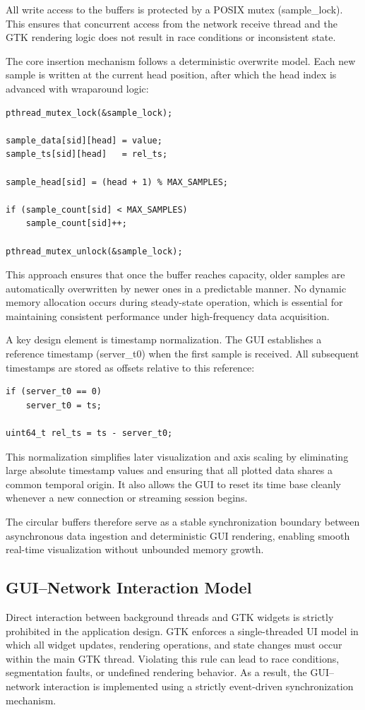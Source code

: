 All write access to the buffers is protected by a POSIX mutex (sample\_lock). This ensures that concurrent access from the network receive thread and the GTK rendering logic does not result in race conditions or inconsistent state.

The core insertion mechanism follows a deterministic overwrite model. Each new sample is written at the current head position, after which the head index is advanced with wraparound logic:
\begin{verbatim}
pthread_mutex_lock(&sample_lock);

sample_data[sid][head] = value;
sample_ts[sid][head]   = rel_ts;

sample_head[sid] = (head + 1) % MAX_SAMPLES;

if (sample_count[sid] < MAX_SAMPLES)
    sample_count[sid]++;

pthread_mutex_unlock(&sample_lock);
\end{verbatim}

This approach ensures that once the buffer reaches capacity, older samples are automatically overwritten by newer ones in a predictable manner. No dynamic memory allocation occurs during steady-state operation, which is essential for maintaining consistent performance under high-frequency data acquisition.

A key design element is timestamp normalization. The GUI establishes a reference timestamp (server\_t0) when the first sample is received. All subsequent timestamps are stored as offsets relative to this reference:


\begin{verbatim}
if (server_t0 == 0)
    server_t0 = ts;

uint64_t rel_ts = ts - server_t0;
\end{verbatim}

This normalization simplifies later visualization and axis scaling by eliminating large absolute timestamp values and ensuring that all plotted data shares a common temporal origin. It also allows the GUI to reset its time base cleanly whenever a new connection or streaming session begins.

The circular buffers therefore serve as a stable synchronization boundary between asynchronous data ingestion and deterministic GUI rendering, enabling smooth real-time visualization without unbounded memory growth.

\subsection{GUI–Network Interaction Model}
Direct interaction between background threads and GTK widgets is strictly prohibited in the application design. GTK enforces a single-threaded UI model in which all widget updates, rendering operations, and state changes must occur within the main GTK thread. Violating this rule can lead to race conditions, segmentation faults, or undefined rendering behavior. As a result, the GUI–network interaction is implemented using a strictly event-driven synchronization mechanism.

